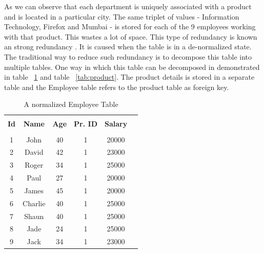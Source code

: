 \documentclass[12pt, oneside]{book}
\begin{document}
As we can observe that each department is uniquely associated with a product and is located in a particular city. The same triplet of values - Information Technology, Firefox and Mumbai - is stored for each of the 9 employees working with that product. This wastes a lot of space. This type of redundancy is known an strong redundancy \cite{redundancy}. It is caused when the table is in a de-normalized state. The traditional way to reduce such redundancy is to decompose this table into multiple tables. One way in which this table can be decomposed in demonstrated in table ~\ref{tab:emp_normal} and table ~\ref{tab:product}. The product details is stored in a separate table and the Employee table refers to the product table as foreign key.

\begin{table}
    \centering
    \begin{tabular}{| c | c | c | c | c | @{}m{0pt}@{}}
    \hline
    \multicolumn{1}{|c|}{} & \multicolumn{1}{c|}{} & \multicolumn{1}{c|}{} & \multicolumn{1}{c|}{} & \multicolumn{1}{c|}{} &  \\
    \multicolumn{1}{|c|}{\textbf{Id}} & \multicolumn{1}{c|}{\textbf{Name}} & \multicolumn{1}{c|}{\textbf{Age}} & \multicolumn{1}{c|}{\textbf{Pr. ID}} & \multicolumn{1}{c|}{\textbf{Salary}} & \\
    \multicolumn{1}{|c|}{} & \multicolumn{1}{c|}{} & \multicolumn{1}{c|}{} & \multicolumn{1}{c|}{} & \multicolumn{1}{c|}{} &  \\
    \hline
    1 & John & 40 & 1 & 20000 & \\ [1ex] \hline
    2 & David & 42 & 1 & 23000 & \\ [1ex] \hline
    3 & Roger & 34 & 1 & 25000 & \\ [1ex] \hline
    4 & Paul & 27 & 1 & 20000 & \\ [1ex] \hline
    5 & James & 45 & 1 & 20000 & \\ [1ex] \hline
    6 & Charlie & 40 & 1 & 25000 & \\ [1ex] \hline
    7 & Shaun & 40 & 1 & 25000 & \\ [1ex] \hline
    8 & Jade & 24 & 1 & 25000 & \\ [1ex] \hline
    9 & Jack & 34 & 1 & 23000 & \\ [1ex] \hline
    \end{tabular}
    \caption{A normalized Employee Table}
    \label{tab:emp_normal}
\end{table}
\end{document}
